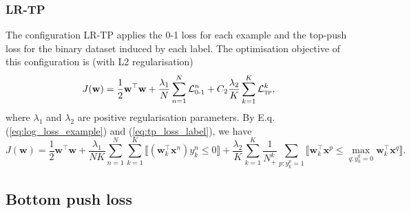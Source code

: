\documentclass[9pt]{extarticle}
\newcommand{\llb}{\llbracket}
\newcommand{\rrb}{\rrbracket}
\newcommand{\x}{\mathbf{x}}
\newcommand{\1}{\mathbf{1}}
\newcommand{\w}{\mathbf{w}}
\newcommand{\LCal}{\mathcal{L}}
\begin{document}
\subsubsection{LR-TP}
\label{sssec:lr_tp}

The configuration LR-TP applies the 0-1 loss for each example and the top-push loss for the binary dataset induced by each label.
The optimisation objective of this configuration is (with L2 regularisation)
$$
J(\w) = \frac{1}{2} \w^\top \w + \frac{\lambda_1}{N} \sum_{n=1}^N \LCal_\textsc{0-1}^n + C_2 \frac{\lambda_2}{K} \sum_{k=1}^K \LCal_\textsc{tp}^k,
$$
where $\lambda_1$ and $\lambda_2$ are positive regularisation parameters.
By E.q. (\ref{eq:log_loss_example}) and (\ref{eq:tp_loss_label}), we have
$$
J(\w) 
= \frac{1}{2} \w^\top \w + 
  \frac{\lambda_1}{NK} \sum_{n=1}^N \sum_{k=1}^K \llb (\w_k^\top \x^n) y_k^n \le 0 \rrb +
  \frac{\lambda_2}{K} \sum_{k=1}^K \frac{1}{N_+^k} \sum_{p: y_k^p=1} \llb \w_k^\top \x^p \le \max_{q: y_k^q=0} \w_k^\top \x^q \rrb.
$$


\subsection{Bottom push loss}
\label{ssec:bpush}
\end{document}
